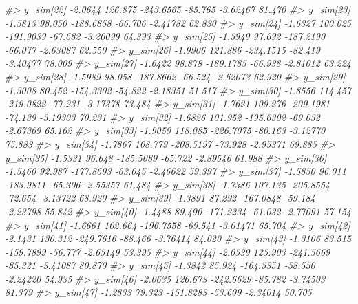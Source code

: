 \documentclass[
  10pt,
  italian,
  a4paper,
  extrafontsizes,onecolumn,openright
  ]{memoir}
\newenvironment{Shaded}{\begin{snugshade}}{\end{snugshade}}
\newcommand{\CommentTok}[1]{\textcolor[rgb]{0.56,0.35,0.01}{\textit{#1}}}
\begin{document}
\begin{Shaded}
\begin{Highlighting}[]
\CommentTok{\#\textgreater{}   y\_sim[22]  {-}2.0644 126.875 {-}243.6565 {-}85.765 {-}3.62467 81.470}
\CommentTok{\#\textgreater{}   y\_sim[23]  {-}1.5813  98.050 {-}188.6858 {-}66.706 {-}2.41782 62.830}
\CommentTok{\#\textgreater{}   y\_sim[24]  {-}1.6327 100.025 {-}191.9039 {-}67.682 {-}3.20099 64.393}
\CommentTok{\#\textgreater{}   y\_sim[25]  {-}1.5949  97.692 {-}187.2190 {-}66.077 {-}2.63087 62.550}
\CommentTok{\#\textgreater{}   y\_sim[26]  {-}1.9906 121.886 {-}234.1515 {-}82.419 {-}3.40477 78.009}
\CommentTok{\#\textgreater{}   y\_sim[27]  {-}1.6422  98.878 {-}189.1785 {-}66.938 {-}2.81012 63.224}
\CommentTok{\#\textgreater{}   y\_sim[28]  {-}1.5989  98.058 {-}187.8662 {-}66.524 {-}2.62073 62.920}
\CommentTok{\#\textgreater{}   y\_sim[29]  {-}1.3008  80.452 {-}154.3302 {-}54.822 {-}2.18351 51.517}
\CommentTok{\#\textgreater{}   y\_sim[30]  {-}1.8556 114.457 {-}219.0822 {-}77.231 {-}3.17378 73.484}
\CommentTok{\#\textgreater{}   y\_sim[31]  {-}1.7621 109.276 {-}209.1981 {-}74.139 {-}3.19303 70.231}
\CommentTok{\#\textgreater{}   y\_sim[32]  {-}1.6826 101.952 {-}195.6302 {-}69.032 {-}2.67369 65.162}
\CommentTok{\#\textgreater{}   y\_sim[33]  {-}1.9059 118.085 {-}226.7075 {-}80.163 {-}3.12770 75.883}
\CommentTok{\#\textgreater{}   y\_sim[34]  {-}1.7867 108.779 {-}208.5197 {-}73.928 {-}2.95371 69.885}
\CommentTok{\#\textgreater{}   y\_sim[35]  {-}1.5331  96.648 {-}185.5089 {-}65.722 {-}2.89546 61.988}
\CommentTok{\#\textgreater{}   y\_sim[36]  {-}1.5460  92.987 {-}177.8693 {-}63.045 {-}2.46622 59.397}
\CommentTok{\#\textgreater{}   y\_sim[37]  {-}1.5850  96.011 {-}183.9811 {-}65.306 {-}2.55357 61.484}
\CommentTok{\#\textgreater{}   y\_sim[38]  {-}1.7386 107.135 {-}205.8554 {-}72.654 {-}3.13722 68.920}
\CommentTok{\#\textgreater{}   y\_sim[39]  {-}1.3891  87.292 {-}167.0848 {-}59.184 {-}2.23798 55.842}
\CommentTok{\#\textgreater{}   y\_sim[40]  {-}1.4488  89.490 {-}171.2234 {-}61.032 {-}2.77091 57.154}
\CommentTok{\#\textgreater{}   y\_sim[41]  {-}1.6661 102.664 {-}196.7558 {-}69.541 {-}3.01471 65.704}
\CommentTok{\#\textgreater{}   y\_sim[42]  {-}2.1431 130.312 {-}249.7616 {-}88.466 {-}3.76414 84.020}
\CommentTok{\#\textgreater{}   y\_sim[43]  {-}1.3106  83.515 {-}159.7899 {-}56.777 {-}2.65149 53.395}
\CommentTok{\#\textgreater{}   y\_sim[44]  {-}2.0539 125.903 {-}241.5669 {-}85.321 {-}3.41087 80.870}
\CommentTok{\#\textgreater{}   y\_sim[45]  {-}1.3842  85.924 {-}164.5351 {-}58.550 {-}2.24220 54.935}
\CommentTok{\#\textgreater{}   y\_sim[46]  {-}2.0635 126.673 {-}242.6629 {-}85.782 {-}3.74503 81.379}
\CommentTok{\#\textgreater{}   y\_sim[47]  {-}1.2833  79.323 {-}151.8283 {-}53.609 {-}2.34014 50.705}

\end{Highlighting}
\end{Shaded}
\end{document}
